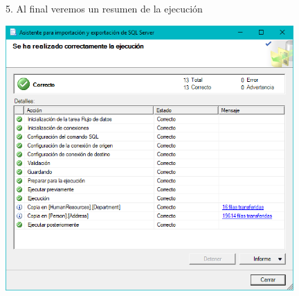 5. Al final veremos un resumen de la ejecución\\
	\begin{center}
	\includegraphics[width=11cm]{./Imagenes/img12}
	\end{center}	